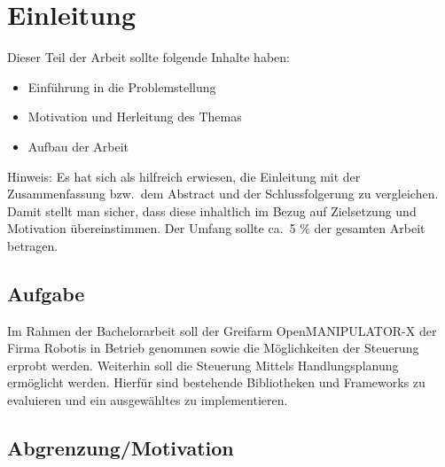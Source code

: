 \section{Einleitung} \label{einleitung}
Dieser Teil der Arbeit sollte folgende Inhalte haben:

\begin{itemize}
\item Einführung in die Problemstellung
\item Motivation und Herleitung des Themas
\item Aufbau der Arbeit
\end{itemize}

Hinweis:
Es hat sich als hilfreich erwiesen, die Einleitung mit der Zusammenfassung bzw.\ dem Abstract und der Schlussfolgerung zu vergleichen.
Damit stellt man sicher, dass diese inhaltlich im Bezug auf Zielsetzung und Motivation übereinstimmen.
Der Umfang sollte ca.\ 5 \% der gesamten Arbeit betragen.
\subsection{Aufgabe}
Im Rahmen der Bachelorarbeit soll der Greifarm OpenMANIPULATOR-X der Firma Robotis in Betrieb genommen sowie die Möglichkeiten der Steuerung erprobt werden.
Weiterhin soll die Steuerung Mittels Handlungsplanung ermöglicht werden.
Hierfür sind bestehende Bibliotheken und Frameworks zu evaluieren und ein ausgewähltes zu implementieren.
\subsection{Abgrenzung/Motivation}

